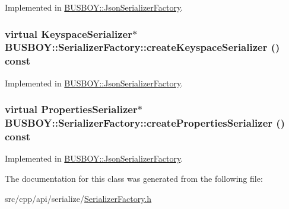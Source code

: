 Implemented in \hyperlink{classBUSBOY_1_1JsonSerializerFactory_a59e34529797620296dcbb69352bdd2ca}{BUSBOY::JsonSerializerFactory}.\hypertarget{classBUSBOY_1_1SerializerFactory_a76f6c404097a5412b5831eb38066e1e2}{
\subsubsection[{createKeyspaceSerializer}]{\setlength{\rightskip}{0pt plus 5cm}virtual {\bf KeyspaceSerializer}$\ast$ BUSBOY::SerializerFactory::createKeyspaceSerializer () const}}
\label{classBUSBOY_1_1SerializerFactory_a76f6c404097a5412b5831eb38066e1e2}


Implemented in \hyperlink{classBUSBOY_1_1JsonSerializerFactory_a1bab634e3e3e407b413f875579b8b16c}{BUSBOY::JsonSerializerFactory}.\hypertarget{classBUSBOY_1_1SerializerFactory_a3e5cee585280539a83558d4553a8d77a}{
\subsubsection[{createPropertiesSerializer}]{\setlength{\rightskip}{0pt plus 5cm}virtual {\bf PropertiesSerializer}$\ast$ BUSBOY::SerializerFactory::createPropertiesSerializer () const}}
\label{classBUSBOY_1_1SerializerFactory_a3e5cee585280539a83558d4553a8d77a}


Implemented in \hyperlink{classBUSBOY_1_1JsonSerializerFactory_aa93357994dab0bf30dca30e00959eb2d}{BUSBOY::JsonSerializerFactory}.

The documentation for this class was generated from the following file:\begin{DoxyCompactItemize}
\item 
src/cpp/api/serialize/\hyperlink{SerializerFactory_8h}{SerializerFactory.h}\end{DoxyCompactItemize}
